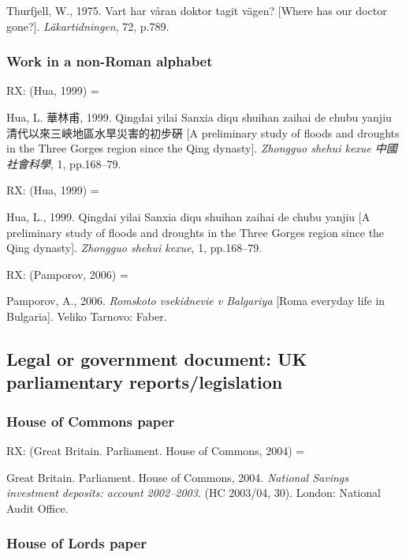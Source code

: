 Thurfjell, W., 1975. Vart har våran doktor tagit vägen? [Where has our doctor gone?]. \emph{Läkartidningen}, 72, p.789.



\subsubsection*{Work in a non-Roman alphabet}

RX: (Hua, 1999) = \cite{hua1999qys1}

Hua, L. 華林甫, 1999. Qingdai yilai Sanxia diqu shuihan zaihai de chubu yanjiu 清代以來三峽地區水旱災害的初步硏 [A preliminary study of floods and droughts in the Three Gorges region since the Qing dynasty]. \emph{Zhongguo shehui kexue \emph{中國社會科學}}, 1, pp.168--79.


RX: (Hua, 1999) = \cite{hua1999qys2}

Hua, L., 1999. Qingdai yilai Sanxia diqu shuihan zaihai de chubu yanjiu [A preliminary study of floods and droughts in the Three Gorges region since the Qing dynasty]. \emph{Zhongguo shehui kexue}, 1, pp.168--79.


RX: (Pamporov, 2006) = \cite{pamporov2006rvb}

Pamporov, A., 2006. \emph{Romskoto vsekidnevie v Balgariya} [Roma everyday life in Bulgaria]. Veliko Tarnovo: Faber.



\subsection{Legal or government document: UK parliamentary reports\slash legislation}


\subsubsection*{House of Commons paper}

RX: (Great Britain. Parliament. House of Commons, 2004) = \cite{gb.hc2003/04-30}

Great Britain. Parliament. House of Commons, 2004. \emph{National Savings investment deposits: account 2002--2003}. (HC 2003/04, 30). London: National Audit Office.



\subsubsection*{House of Lords paper}

